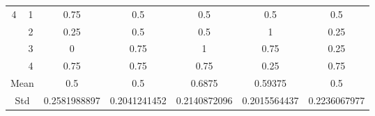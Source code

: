 \documentclass[draft,dvipsnames]{drexel-thesis}
\begin{document}
\begin{thesis}
\begin{table}[!t]
\begin{tabular}{|c|c|c|c|c|c|c|}
\multirow{4}{*}{4}    & 1                   & 0.75         & 0.5          & 0.5          & 0.5          & 0.5          \\ \cline{2-7}
                      & 2                   & 0.25         & 0.5          & 0.5          & 1            & 0.25         \\ \cline{2-7}
                      & 3                   & 0            & 0.75         & 1            & 0.75         & 0.25         \\ \cline{2-7}
                      & 4                   & 0.75         & 0.75         & 0.75         & 0.25         & 0.75         \\ \hline
\multicolumn{2}{|c|}{Mean}                  & 0.5          & 0.5          & 0.6875       & 0.59375      & 0.5          \\ \hline
\multicolumn{2}{|c|}{Std}                   & 0.2581988897 & 0.2041241452 & 0.2140872096 & 0.2015564437 & 0.2236067977 \\ \hline
\end{tabular}
\end{table}


\end{thesis}
\end{document}
